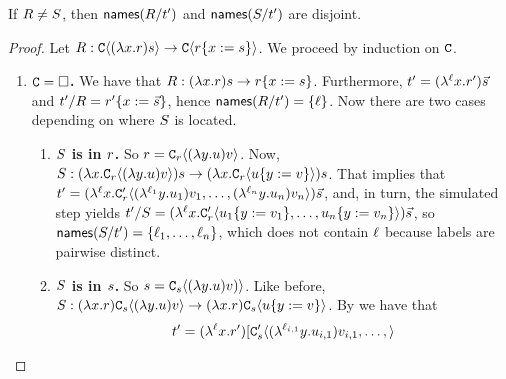 
\begin{lemma}
If $R \neq S$, then $\mathsf{names}(R/t')$ and $\mathsf{names}(S/t')$ are disjoint.
\end{lemma}
\begin{proof}
Let $R : \mathtt{C}\langle(\lambda x. r)s\rangle \to \mathtt{C}\langle r\{x := s\}\rangle$.
We proceed by induction on $\mathtt{C}$.
\begin{enumerate}
  \item {\bf $\mathtt{C} = \Box$.}
    We have that $R : (\lambda x. r)s \to r\{x := s\}$.
    Furthermore,
    $t' = (\lambda^{\ell} x. r') \vec{s}$
    and $t' / R = r'\{x := \vec{s}\}$, hence $\mathsf{names}(R / t') = \{\ell\}$.
    Now there are two cases depending on where $S$ is located.
    \begin{enumerate}
      \item {\bf $S$ is in $r$.}
        So $r = \mathtt{C}_{r}\langle(\lambda y. u) v\rangle$.
        Now, $S : (\lambda x. \mathtt{C}_{r}\langle(\lambda y. u) v\rangle) s
             \to (\lambda x. \mathtt{C}_{r}\langle u\{y := v\}\rangle) s$.
        That implies that
          $t' = (\lambda^{\ell} x. \mathtt{C}'_{r}\langle
            (\lambda^{\ell_1} y. u_1) v_1, \hdots,
            (\lambda^{\ell_n} y. u_n) v_n\rangle) \vec{s}$,
        and, in turn, the simulated step yields
          $t' / S = (\lambda^{\ell} x. \mathtt{C}'_{r}\langle
            u_1\{y := v_1\}, \hdots,
            u_n\{y := v_n\}\rangle) \vec{s}$,
        so $\mathsf{names}(S / t') = \{\ell_1, \hdots, \ell_n\}$, which does not contain $\ell$ because
        labels are pairwise distinct.
      \item {\bf $S$ is in $s$.}
        So $s = \mathtt{C}_{s}\langle(\lambda y. u) v)\rangle$.
        Like before,
          $S : (\lambda x. r) \mathtt{C}_{s}\langle(\lambda y. u) v\rangle
             \to (\lambda x. r) \mathtt{C}_{s}\langle u\{y := v\}\rangle$.
        By  we have that \[t' = (\lambda^{\ell} x. r') [\mathtt{C}'_{s}\langle
          (\lambda^{\ell_{i,1}} y. u_{i,1}) v_{i,1}, \hdots,
\rangle\]
\end{enumerate}
\end{enumerate}
\end{proof}
